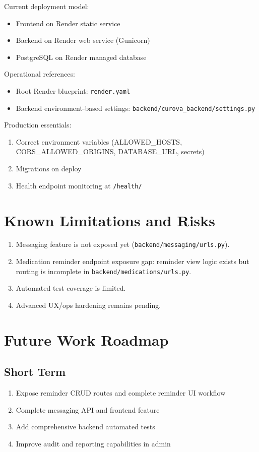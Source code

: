 \documentclass[12pt,a4paper]{article}
\begin{document}
Current deployment model:
\begin{itemize}
  \item Frontend on Render static service
  \item Backend on Render web service (Gunicorn)
  \item PostgreSQL on Render managed database
\end{itemize}

Operational references:
\begin{itemize}
  \item Root Render blueprint: \texttt{render.yaml}
  \item Backend environment-based settings: \texttt{backend/curova\_backend/settings.py}
\end{itemize}

Production essentials:
\begin{enumerate}
  \item Correct environment variables (ALLOWED\_HOSTS, CORS\_ALLOWED\_ORIGINS, DATABASE\_URL, secrets)
  \item Migrations on deploy
  \item Health endpoint monitoring at \texttt{/health/}
\end{enumerate}

\section{Known Limitations and Risks}

\begin{enumerate}
  \item Messaging feature is not exposed yet (\texttt{backend/messaging/urls.py}).
  \item Medication reminder endpoint exposure gap: reminder view logic exists but routing is incomplete in \texttt{backend/medications/urls.py}.
  \item Automated test coverage is limited.
  \item Advanced UX/ops hardening remains pending.
\end{enumerate}

\section{Future Work Roadmap}

\subsection*{Short Term}
\begin{enumerate}
  \item Expose reminder CRUD routes and complete reminder UI workflow
  \item Complete messaging API and frontend feature
  \item Add comprehensive backend automated tests
  \item Improve audit and reporting capabilities in admin
\end{enumerate}
\end{document}
